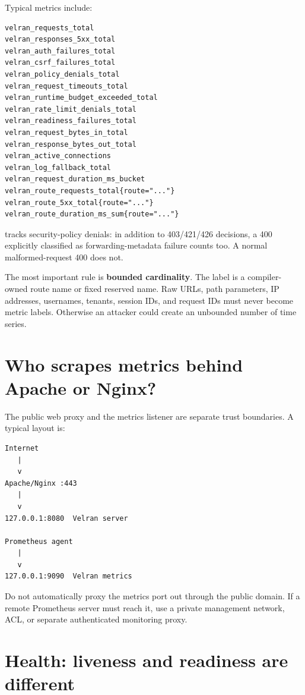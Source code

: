 Typical metrics include:

\begin{lstlisting}
velran_requests_total
velran_responses_5xx_total
velran_auth_failures_total
velran_csrf_failures_total
velran_policy_denials_total
velran_request_timeouts_total
velran_runtime_budget_exceeded_total
velran_rate_limit_denials_total
velran_readiness_failures_total
velran_request_bytes_in_total
velran_response_bytes_out_total
velran_active_connections
velran_log_fallback_total
velran_request_duration_ms_bucket
velran_route_requests_total{route="..."}
velran_route_5xx_total{route="..."}
velran_route_duration_ms_sum{route="..."}
\end{lstlisting}

 tracks security-policy denials: in addition to 403/421/426 decisions, a 400 explicitly classified as forwarding-metadata failure counts too. A normal malformed-request 400 does not.

The most important rule is \textbf{bounded cardinality}. The  label is a compiler-owned route name or fixed reserved name. Raw URLs, path parameters, IP addresses, usernames, tenants, session IDs, and request IDs must never become metric labels. Otherwise an attacker could create an unbounded number of time series.

\Needspace{0.42\textheight}
\section{Who scrapes metrics behind Apache or Nginx?}

The public web proxy and the metrics listener are separate trust boundaries. A typical layout is:

\begin{lstlisting}
Internet
   |
   v
Apache/Nginx :443
   |
   v
127.0.0.1:8080  Velran server

Prometheus agent
   |
   v
127.0.0.1:9090  Velran metrics
\end{lstlisting}

Do not automatically proxy the metrics port out through the public domain. If a remote Prometheus server must reach it, use a private management network, ACL, or separate authenticated monitoring proxy.

\section{Health: liveness and readiness are different}

